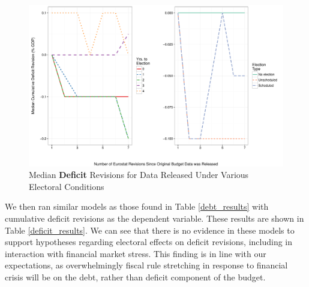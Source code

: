 \documentclass[]{article}
\begin{document}
\begin{figure}
    \begin{center}
        \caption{Median \textbf{Deficit} Revisions for Data Released Under Various Electoral Conditions}
        \label{median_deficit_revisions}
        \includegraphics[scale=0.55]{figures/median_deficit_revisions.pdf}
    \end{center}
\end{figure}


We then ran similar models as those found in Table \ref{debt_results} with cumulative deficit revisions as the dependent variable. These results are shown in Table \ref{deficit_results}. We can see that there is no evidence in these models to support hypotheses regarding electoral effects on deficit revisions, including in interaction with financial market stress. This finding is in line with our expectations, as overwhelmingly fiscal rule stretching in response to financial crisis will be on the debt, rather than deficit component of the budget.

\begin{landscape}
    
\end{landscape}
\end{document}
